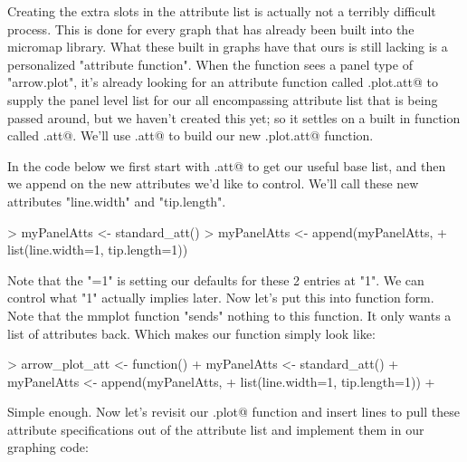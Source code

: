 \documentclass{article}
\begin{document}
Creating the extra slots in the attribute list is actually not a terribly difficult process. This is done for every graph that has already been built into the micromap library. What these built in graphs have that ours is still lacking is a personalized "attribute function". When the \verb@mmplot@ function sees a panel type of "arrow.plot", it's already looking for an attribute function called \verb@arrow.plot.att@ to supply the panel level list for our all encompassing attribute list that is being passed around, but we haven't created this yet; so it settles on a built in function called \verb@standard.att@. We'll use \verb@standard.att@ to build our new \verb@arrow.plot.att@ function.

In the code below we first start with \verb@standard.att@ to get our useful base list, and then we append on the new attributes we'd like to control. We'll call these new attributes "line.width" and "tip.length".

\begin{Schunk}
\begin{Sinput}
> myPanelAtts <- standard_att()
> myPanelAtts <- append(myPanelAtts,
+ list(line.width=1, tip.length=1))
\end{Sinput}
\end{Schunk}

Note that the "=1" is setting our defaults for these 2 entries at "1". We can control what "1" actually implies later. Now let's put this into function form. Note that the mmplot function "sends" nothing to this function. It only wants a
list of attributes back. Which makes our function simply look like:

\begin{Schunk}
\begin{Sinput}
> arrow_plot_att <- function(){
+   myPanelAtts <- standard_att()
+   myPanelAtts <- append(myPanelAtts,
+   list(line.width=1, tip.length=1))
+ }
\end{Sinput}
\end{Schunk}

Simple enough. Now let's revisit our \verb@arrow.plot@ function and insert lines to pull these attribute specifications out of the attribute list and implement them in our graphing code:
\end{document}
